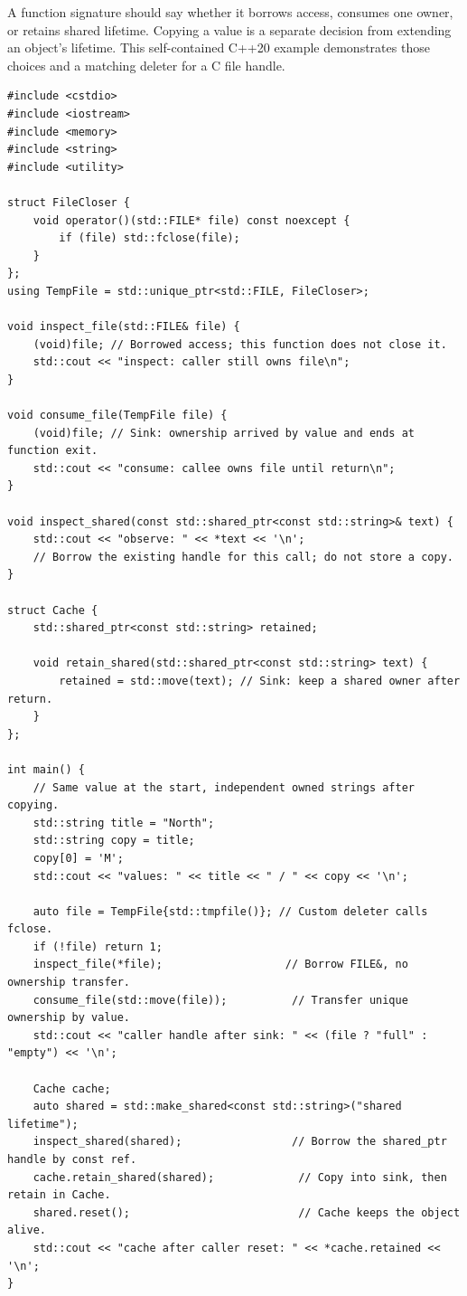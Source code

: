 A function signature should say whether it borrows access, consumes one owner, or retains shared lifetime. Copying a value is a separate decision from extending an object's lifetime. This self-contained C++20 example demonstrates those choices and a matching deleter for a C file handle.

\begin{verbatim}
#include <cstdio>
#include <iostream>
#include <memory>
#include <string>
#include <utility>

struct FileCloser {
    void operator()(std::FILE* file) const noexcept {
        if (file) std::fclose(file);
    }
};
using TempFile = std::unique_ptr<std::FILE, FileCloser>;

void inspect_file(std::FILE& file) {
    (void)file; // Borrowed access; this function does not close it.
    std::cout << "inspect: caller still owns file\n";
}

void consume_file(TempFile file) {
    (void)file; // Sink: ownership arrived by value and ends at function exit.
    std::cout << "consume: callee owns file until return\n";
}

void inspect_shared(const std::shared_ptr<const std::string>& text) {
    std::cout << "observe: " << *text << '\n';
    // Borrow the existing handle for this call; do not store a copy.
}

struct Cache {
    std::shared_ptr<const std::string> retained;

    void retain_shared(std::shared_ptr<const std::string> text) {
        retained = std::move(text); // Sink: keep a shared owner after return.
    }
};

int main() {
    // Same value at the start, independent owned strings after copying.
    std::string title = "North";
    std::string copy = title;
    copy[0] = 'M';
    std::cout << "values: " << title << " / " << copy << '\n';

    auto file = TempFile{std::tmpfile()}; // Custom deleter calls fclose.
    if (!file) return 1;
    inspect_file(*file);                   // Borrow FILE&, no ownership transfer.
    consume_file(std::move(file));          // Transfer unique ownership by value.
    std::cout << "caller handle after sink: " << (file ? "full" : "empty") << '\n';

    Cache cache;
    auto shared = std::make_shared<const std::string>("shared lifetime");
    inspect_shared(shared);                 // Borrow the shared_ptr handle by const ref.
    cache.retain_shared(shared);             // Copy into sink, then retain in Cache.
    shared.reset();                          // Cache keeps the object alive.
    std::cout << "cache after caller reset: " << *cache.retained << '\n';
}
\end{verbatim}

